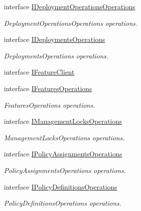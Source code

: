 \begin{DoxyCompactItemize}
\item 
interface \hyperlink{interface_microsoft_1_1_azure_1_1_management_1_1_resources_1_1_i_deployment_operations_operations}{I\+Deployment\+Operations\+Operations}
\begin{DoxyCompactList}\small\item\em Deployment\+Operations\+Operations operations. \end{DoxyCompactList}\item 
interface \hyperlink{interface_microsoft_1_1_azure_1_1_management_1_1_resources_1_1_i_deployments_operations}{I\+Deployments\+Operations}
\begin{DoxyCompactList}\small\item\em Deployments\+Operations operations. \end{DoxyCompactList}\item 
interface \hyperlink{interface_microsoft_1_1_azure_1_1_management_1_1_resources_1_1_i_feature_client}{I\+Feature\+Client}
\item 
interface \hyperlink{interface_microsoft_1_1_azure_1_1_management_1_1_resources_1_1_i_features_operations}{I\+Features\+Operations}
\begin{DoxyCompactList}\small\item\em Features\+Operations operations. \end{DoxyCompactList}\item 
interface \hyperlink{interface_microsoft_1_1_azure_1_1_management_1_1_resources_1_1_i_management_locks_operations}{I\+Management\+Locks\+Operations}
\begin{DoxyCompactList}\small\item\em Management\+Locks\+Operations operations. \end{DoxyCompactList}\item 
interface \hyperlink{interface_microsoft_1_1_azure_1_1_management_1_1_resources_1_1_i_policy_assignments_operations}{I\+Policy\+Assignments\+Operations}
\begin{DoxyCompactList}\small\item\em Policy\+Assignments\+Operations operations. \end{DoxyCompactList}\item 
interface \hyperlink{interface_microsoft_1_1_azure_1_1_management_1_1_resources_1_1_i_policy_definitions_operations}{I\+Policy\+Definitions\+Operations}
\begin{DoxyCompactList}\small\item\em Policy\+Definitions\+Operations operations. \end{DoxyCompactList}\item 

\end{DoxyCompactItemize}
